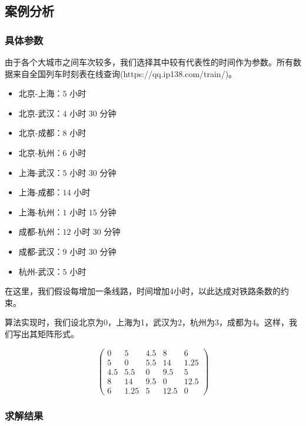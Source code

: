 \documentclass[12pt, a4paper, oneside]{ctexart}
\begin{document}
\subsection{案例分析} 

\subsubsection{具体参数}
由于各个大城市之间车次较多，我们选择其中较有代表性的时间作为参数。所有数据来自全国列车时刻表在线查询(https://qq.ip138.com/train/)。
\begin{itemize}
    \item 北京-上海：$5$ 小时
    \item 北京-武汉：$4$ 小时 $30$ 分钟
    \item 北京-成都：$8$ 小时
    \item 北京-杭州：$6$ 小时
    \item 上海-武汉：$5$ 小时 $30$ 分钟
    \item 上海-成都：$14$ 小时
    \item 上海-杭州：$1$ 小时 $15$ 分钟
    \item 成都-杭州：$12$ 小时 $30$ 分钟
    \item 成都-武汉：$9$ 小时 $30$ 分钟
    \item 杭州-武汉：$5$ 小时
\end{itemize}
在这里，我们假设每增加一条线路，时间增加4小时，以此达成对铁路条数的约束。

算法实现时，我们设北京为0，上海为1，武汉为2，杭州为3，成都为4。这样，我们写出其矩阵形式。

\[
\begin{pmatrix}
    0 & 5 & 4.5 & 8 & 6 \\
    5 & 0 & 5.5 & 14 & 1.25 \\
    4.5 & 5.5 & 0 & 9.5 & 5 \\
    8 & 14 & 9.5 & 0 & 12.5 \\
    6 & 1.25 & 5 & 12.5 & 0
\end{pmatrix}
\]
\subsubsection{求解结果}

%
\end{document}
